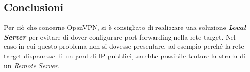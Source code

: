


\subsection{Conclusioni}
Per ciò che concerne OpenVPN, si è consigliato di realizzare una soluzione \textbf{\textit{Local Server}} per
evitare di dover configurare port forwarding nella rete target. Nel caso in cui questo
problema non si dovesse presentare, ad esempio perché la rete target disponesse di un
pool di IP pubblici, sarebbe possibile tentare la strada di un \textit{Remote Server}.
